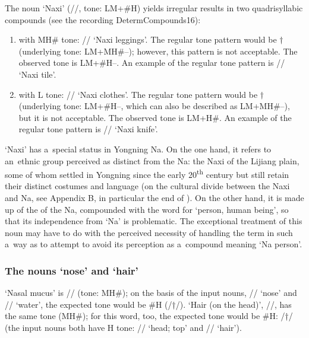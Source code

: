 The noun ‘Naxi’ (//, tone: LM+\#H) yields irregular results in two quadrisyllabic compounds (see the recording DetermCompounds16):
\begin{enumerate}[label=(\roman*)]
\item with MH\# tone: // ‘Naxi leggings’. The regular tone pattern would be
  $\dagger$ (underlying tone: LM+MH\#--); however, this pattern is
  not acceptable. The observed tone is LM+\#H--. An example of the regular tone pattern
  is // ‘Naxi tile’.
\item with L tone: // ‘Naxi clothes’. The regular tone pattern would be
  $\dagger$ (underlying tone: LM+\#H--, which can also be described as
  LM+MH\#--), but it is not acceptable. The observed tone is LM+H\#. An example of
  the regular tone pattern is // ‘Naxi knife’.
\end{enumerate}
‘Naxi’ has a~special status in Yongning Na. On the one hand, it refers to an~ethnic group perceived
as distinct from the Na: the Naxi of the Lijiang plain, some of whom settled in Yongning
since the early 20\textsuperscript{th} century but still retain their distinct costumes and language (on the cultural divide between the Naxi and Na, see Appendix B, in particular the end of ). On the other hand, it
is made up of the  of the Na, compounded with the word for ‘person, human being’, so that its
independence from ‘Na’ is problematic. The exceptional treatment of this noun may have to do with
the perceived necessity of handling the term in such a~way as to attempt to avoid its perception as
a~compound meaning ‘Na person’.


\subsubsection{The nouns ‘nose’ and ‘hair’}
\label{sec:thenounsnoseandhair}

‘Nasal mucus’ is // (tone: MH\#); on the basis of the input nouns, // ‘nose’ and
// ‘water’, the expected tone would be \#H (/†/). ‘Hair (on the head)’,
//, has the same tone (MH\#); for this word, too, the expected tone would be \#H: /†/ (the input nouns both have H tone: // ‘head; top’ and // ‘hair’).

